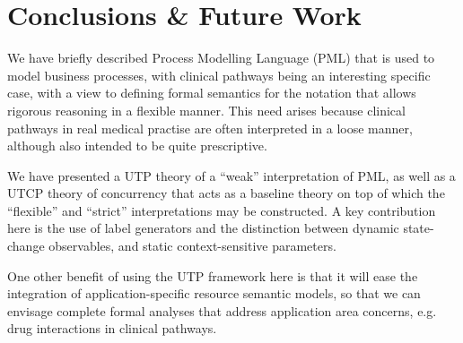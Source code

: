 \section{Conclusions \& Future Work}\label{ha:conc}


We have briefly described Process Modelling Language (PML)
that is used to model business processes,
with clinical pathways being an interesting specific case,
with a view to defining formal semantics for the notation
that allows rigorous reasoning in a flexible manner.
This need arises because clinical pathways in real medical practise
are often interpreted in a loose manner,
although also intended to be quite prescriptive.

We have presented a UTP theory of a ``weak'' interpretation
of PML,
as well as a UTCP theory of concurrency that
acts as a baseline theory on top of which the ``flexible''
and ``strict'' interpretations may be constructed.
A key contribution here is the use of label generators
and the distinction between dynamic state-change observables,
and static context-sensitive parameters.

One other benefit of using the UTP framework here
is that it will ease the integration of application-specific
resource semantic models,
so that we can envisage complete formal analyses
that address application area concerns,
e.g. drug interactions in clinical pathways.
